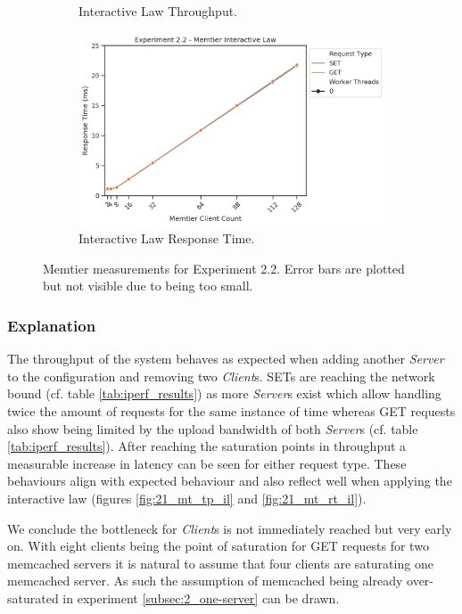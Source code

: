 \begin{figure}
\begin{subfigure}[t!]{0.45\textwidth}
                \caption{Interactive Law \textendash{} Throughput.\label{fig:22_mt_tp_il}}
                \includegraphics[width=\textwidth]{../data_analysis/figures/2-2_mt_response-time-il.png}
                \caption{Interactive Law \textendash{} Response Time.\label{fig:22_mt_rt_il}}
            \end{subfigure}
            \caption{Memtier measurements for Experiment 2.2. Error bars are plotted but not visible due to being too
                     small.\label{fig:21_all}}
        \end{figure}

        \subsubsection{Explanation}

            The throughput of the system behaves as expected when adding another \emph{Server} to the configuration
            and removing two \emph{Client}s. SETs are reaching the network bound (cf. table \ref{tab:iperf_results})
            as more \emph{Server}s exist which allow handling twice the amount of requests for the same instance of
            time whereas GET requests also show being limited by the upload bandwidth of both \emph{Server}s (cf.
            table \ref{tab:iperf_results}). After reaching the saturation points in throughput a measurable increase
            in latency can be seen for either request type. These behaviours align with expected behaviour and also
            reflect well when applying the interactive law (figures \ref{fig:21_mt_tp_il} and
            \ref{fig:21_mt_rt_il}).

            We conclude the bottleneck for \emph{Client}s is not immediately reached but very early on. With eight
            clients being the point of saturation for GET requests for two memcached servers it is natural to assume
            that four clients are saturating one memcached server. As such the assumption of memcached being already
            over-saturated in experiment \ref{subsec:2_one-server} can be drawn.

